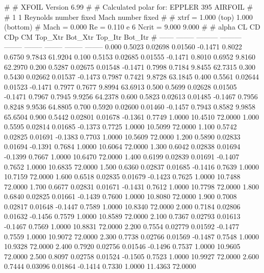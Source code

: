 #  
#       XFOIL         Version 6.99
#  
# Calculated polar for: EPPLER 395 AIRFOIL                              
#  
# 1 1 Reynolds number fixed          Mach number fixed         
#  
# xtrf =   1.000 (top)        1.000 (bottom)  
# Mach =   0.000     Re =     0.110 e 6     Ncrit =   9.000  9.000
#  
#   alpha    CL        CD       CDp       CM     Top_Xtr  Bot_Xtr  Top_Itr  Bot_Itr
#  ------ -------- --------- --------- -------- -------- -------- -------- --------
   0.000   0.5023   0.02698   0.01560  -0.1471   0.8022   0.6750   9.7843  61.9204
   0.100   0.5153   0.02685   0.01555  -0.1471   0.8010   0.6952   9.8160  62.2970
   0.200   0.5287   0.02675   0.01548  -0.1471   0.7998   0.7184   9.8455  62.7315
   0.300   0.5430   0.02662   0.01537  -0.1473   0.7987   0.7421   9.8728  63.1845
   0.400   0.5561   0.02644   0.01523  -0.1471   0.7977   0.7677   9.8994  63.6913
   0.500   0.5699   0.02628   0.01505  -0.1471   0.7967   0.7945   9.9256  64.2378
   0.600   0.5823   0.02613   0.01485  -0.1467   0.7956   0.8248   9.9536  64.8805
   0.700   0.5920   0.02600   0.01460  -0.1457   0.7943   0.8582   9.9858  65.6504
   0.900   0.5442   0.02801   0.01678  -0.1361   0.7749   1.0000  10.4510  72.0000
   1.000   0.5595   0.02814   0.01685  -0.1373   0.7725   1.0000  10.5099  72.0000
   1.100   0.5742   0.02825   0.01691  -0.1383   0.7703   1.0000  10.5609  72.0000
   1.200   0.5890   0.02833   0.01694  -0.1391   0.7684   1.0000  10.6064  72.0000
   1.300   0.6042   0.02838   0.01694  -0.1399   0.7667   1.0000  10.6470  72.0000
   1.400   0.6199   0.02839   0.01691  -0.1407   0.7652   1.0000  10.6835  72.0000
   1.500   0.6360   0.02837   0.01685  -0.1416   0.7639   1.0000  10.7159  72.0000
   1.600   0.6518   0.02835   0.01679  -0.1423   0.7625   1.0000  10.7488  72.0000
   1.700   0.6677   0.02831   0.01671  -0.1431   0.7612   1.0000  10.7798  72.0000
   1.800   0.6840   0.02825   0.01661  -0.1439   0.7600   1.0000  10.8080  72.0000
   1.900   0.7008   0.02817   0.01648  -0.1447   0.7589   1.0000  10.8340  72.0000
   2.000   0.7184   0.02806   0.01632  -0.1456   0.7579   1.0000  10.8589  72.0000
   2.100   0.7367   0.02793   0.01613  -0.1467   0.7569   1.0000  10.8831  72.0000
   2.200   0.7554   0.02779   0.01592  -0.1477   0.7559   1.0000  10.9072  72.0000
   2.300   0.7738   0.02766   0.01569  -0.1487   0.7548   1.0000  10.9328  72.0000
   2.400   0.7920   0.02756   0.01546  -0.1496   0.7537   1.0000  10.9605  72.0000
   2.500   0.8097   0.02758   0.01524  -0.1505   0.7523   1.0000  10.9927  72.0000
   2.600   0.7444   0.03096   0.01864  -0.1414   0.7330   1.0000  11.4363  72.0000
